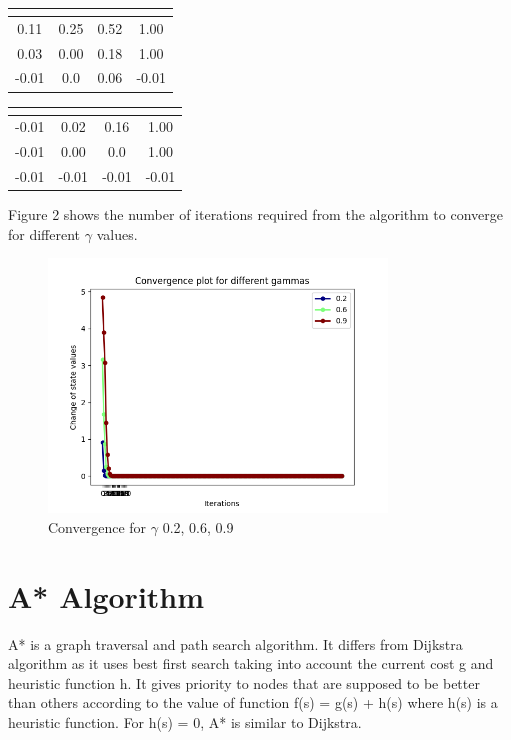 \documentclass[10pt,a4paper,twocolumn]{article}
\begin{document}
	
		\begin{center}
		\begin{tabular}{ c c c c}
						 \hline
			\multicolumn{4}{|c|}{  \text{$\gamma = 0.6$} } \\
			\hline
			0.11 & 0.25 & 0.52 &1.00 \\ 
			0.03 & 0.00 & 0.18 & 1.00  \\  
			-0.01 &  0.0 & 0.06 & -0.01    
		\end{tabular}
	\end{center}


	\begin{center}
	\begin{tabular}{ c c c c}
	 \hline
		\multicolumn{4}{|c|}{  \text{$\gamma = 0.2$} } \\
		\hline
		-0.01  & 0.02  & 0.16 & 1.00 \\ 
		-0.01  & 0.00  & 0.0  & 1.00 \\  
		-0.01 & -0.01 &  -0.01 & -0.01
	\end{tabular}
\end{center}


Figure 2 shows the number of iterations required from the algorithm to converge for different $\gamma$ values.

\begin{figure}[ht!]
	\centering
	\includegraphics[width=90mm]{gammas}
	\caption{Convergence for $\gamma$ 0.2, 0.6, 0.9 }
\end{figure}


	\section{A* Algorithm}
	A* is a graph traversal and path search algorithm. It differs from Dijkstra algorithm as it uses best first search taking into account the current cost g and heuristic function h. It gives priority to nodes that are supposed to be better than others according to the value of function f(s) = g(s) + h(s) where h(s) is a heuristic function. For h(s) = 0, A* is similar to Dijkstra.
	
\end{document}
